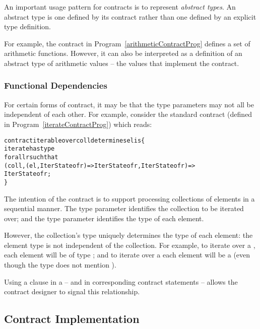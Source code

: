 \begin{aside}
An important usage pattern for contracts is to represent \emph{abstract types}. An abstract type is one defined by its contract rather than one defined by an explicit type definition.

For example, the  contract in Program~\vref{arithmeticContractProg} defines a set of arithmetic functions. However, it can also be interpreted as a definition of an abstract type of arithmetic values -- the values that implement the  contract.
\end{aside}

\subsubsection{Functional Dependencies}
\label{ContractFunctionalDependency}

For certain forms of contract, it may be that the type parameters may not all be independent of each other. For example, consider the standard  contract (defined in Program~\vref{iterateContractProg}) which reads:
\begin{alltt}
contract iterable over coll determines el is \{
  iterate has type 
    for all r such that 
      (coll,(el,IterState of r)=>IterState of r,IterState of r) => 
        IterState of r;
\}
\end{alltt}
The intention of the  contract is to support processing collections of elements in a sequential manner. The type parameter  identifies the collection to be iterated over; and the type parameter  identifies the type of each element.

However, the collection's type uniquely determines the type of each element: the element type is not independent of the collection. For example, to iterate over a , each element will be of type ; and to iterate over a  each element will be a  (even though the  type does not mention ).

Using a  clause in a  -- and in corresponding contract  statements -- allows the contract designer to signal this relationship.

\subsection{Contract Implementation}
\label{ContractImplementation}

